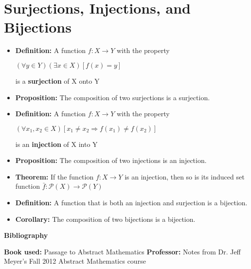 \documentclass{report}
\begin{document}
	\section{Surjections, Injections, and Bijections}
		\begin{itemize}\addtolength{\leftskip}{2em}
			\item \textbf{Definition:} A function $f:X\rightarrow Y$ with the property
			\begin{center}
				$(\forall y\in Y)(\exists x\in X)[f(x)=y]$
			\end{center}
			\subsubitem is a \textbf{surjection} of X onto Y 
			\item \textbf{Proposition:} The composition of two surjections is a surjection. 
			\item \textbf{Definition:} A function $f:X\rightarrow Y$ with the property
			\begin{center}
				$(\forall x_1,x_2\in X)[x_1\ne x_2\Rightarrow f(x_1)\ne f(x_2)]$
			\end{center}
			\subsubitem is an \textbf{injection} of X into Y
			\item \textbf{Proposition:} The composition of two injections is an injection.
			\item \textbf{Theorem:} If the function $f:X\rightarrow Y$ is an injection, then so is its induced set function $\bar{f}:\mathcal{P}(X)\rightarrow \mathcal{P}(Y)$
			\item \textbf{Definition:} A function that is both an injection and surjection is a bijection.
			\item \textbf{Corollary:} The composition of two bijections is a bijection.
		\end{itemize}

	\vspace{45em}
	
	\begin{center}
	\textbf{\huge{Bibliography}}
	\end{center}
	\textbf{Book used:} Passage to Abstract Mathematics\newline
	\textbf{Professor:} Notes from Dr. Jeff Meyer's Fall 2012 Abstract Mathematics course
\end{document}
